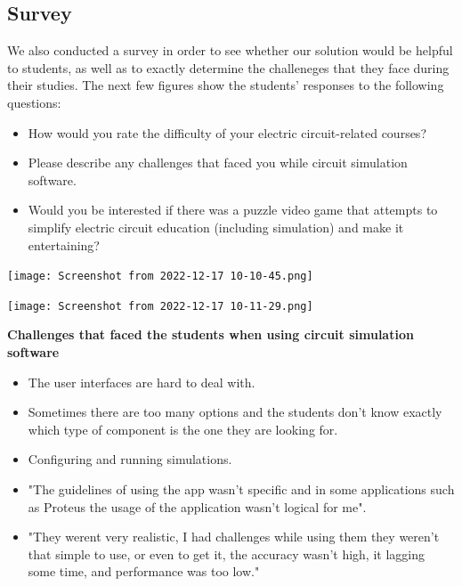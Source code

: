 \documentclass[twoside,a4paper,11pt]{article}
\begin{document}
\begin{multicols}{2}
\subsection{Survey}
We also conducted a survey in order to see whether our solution would be helpful to students, as well as to exactly determine the challeneges that they face during their studies. The next few figures show the students' responses to the following questions:
\begin{itemize}
    \item How would you rate the difficulty of your electric circuit-related courses?
    \item Please describe any challenges that faced you while circuit simulation software.
    \item Would you be interested if there was a puzzle video game that attempts to simplify electric circuit education (including simulation) and make it entertaining? 
\end{itemize} 
\begin{center}
    \texttt{[image: Screenshot from 2022-12-17 10-10-45.png]}
\end{center}

\begin{center}
    \texttt{[image: Screenshot from 2022-12-17 10-11-29.png]}
\end{center}

\raggedright\textbf{Challenges that faced the students when using circuit simulation software}
\begin{itemize}
    \item The user interfaces are hard to deal with.
    \item Sometimes there are too many options and the students don't know exactly which type of component is the one they are looking for.
    \item Configuring and running simulations.
    \item "The guidelines of using the app wasn't specific and in some applications such as Proteus the usage of the application wasn't logical for me". 
    \item "They werent very realistic, I had challenges while using them they weren't that simple to use, or even to get it, the accuracy wasn't high, it lagging some time, and performance was too low."
\end{itemize}


\end{multicols}
\end{document}

